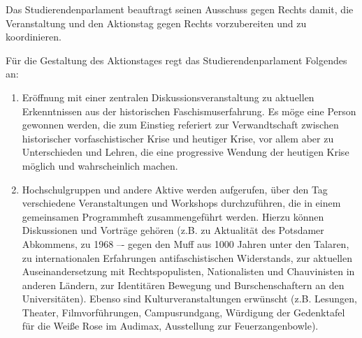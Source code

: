 \documentclass[ngerman,headheight=70pt]{scrartcl}
\begin{document}
    Das Studierendenparlament beauftragt seinen Ausschuss gegen Rechts damit, die
    Veranstaltung und den Aktionstag gegen Rechts vorzubereiten und zu koordinieren.

    Für die Gestaltung des Aktionstages regt das Studierendenparlament Folgendes an:

    \begin{enumerate}
        \item Eröffnung mit einer zentralen Diskussionsveranstaltung zu aktuellen
        Erkenntnissen aus der historischen Faschismuserfahrung. Es möge eine Person
        gewonnen werden, die zum Einstieg referiert zur Verwandtschaft zwischen
        historischer vorfaschistischer Krise und heutiger Krise, vor allem aber
        zu Unterschieden und Lehren, die eine progressive Wendung der heutigen
         Krise möglich und wahrscheinlich machen.

        \item Hochschulgruppen und andere Aktive werden aufgerufen, über den Tag
        verschiedene Veranstaltungen und Workshops durchzuführen, die in einem
        gemeinsamen Programmheft zusammengeführt werden. Hierzu können Diskussionen
        und Vorträge gehören (z.B. zu Aktualität des Potsdamer Abkommens, zu
        1968 –- gegen den Muff aus 1000 Jahren unter den Talaren, zu internationalen
        Erfahrungen antifaschistischen Widerstands, zur aktuellen Auseinandersetzung
        mit Rechtspopulisten, Nationalisten und Chauvinisten in anderen Ländern,
        zur Identitären Bewegung und Burschenschaftern an den Universitäten).
        Ebenso sind Kulturveranstaltungen erwünscht (z.B. Lesungen, Theater,
        Filmvorführungen, Campusrundgang, Würdigung der Gedenktafel für die
        Weiße Rose im Audimax, Ausstellung zur Feuerzangenbowle).
    \end{enumerate}
\end{document}
